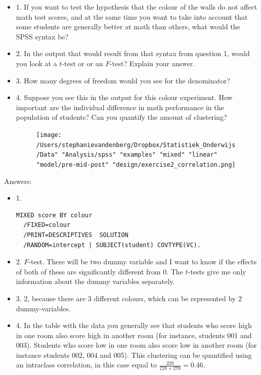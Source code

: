 \documentclass[]{report}\usepackage[]{graphicx}\usepackage[]{color}
\begin{document}
\begin{itemize}
\item 1. If you want to test the hypothesis that the colour of the walls do not affect math test scores, and at the same time you want to take into account that some students are generally better at math than others, what would the SPSS syntax be? \\
\item 2. In the output that would result from that syntax from question 1, would you look at a $t$-test or or an $F$-test? Explain your answer.
\item 3. How many degrees of freedom would you see for the denominator?\\
\item 4. Suppose you see this in the output for this colour experiment. How important are the individual difference in math performance in the population of students? Can you quantify the amount of clustering?



\begin{figure}[h]
    \begin{center}
       \texttt{[image: /Users/stephanievandenberg/Dropbox/Statistiek\_Onderwijs/Data" "Analysis/spss" "examples" "mixed" "linear" "model/pre-mid-post" "design/exercise2\_correlation.png]}
    \end{center}
\end{figure}

\end{itemize}


Answers:
\begin{itemize}
\item 1.
\\
\begin{verbatim}
MIXED score BY colour
  /FIXED=colour
  /PRINT=DESCRIPTIVES  SOLUTION
  /RANDOM=intercept | SUBJECT(student) COVTYPE(VC).
\end{verbatim}

\item 2. $F$-test. There will be two dummy variable and I want to know if the effects of both of these are significantly different from 0. The $t$-tests  give me only information about the dummy variables separately. \\
\item 3. 2, because there are 3 different colours, which can be represented by 2 dummy-variables. \\
\item 4. In the table with the data you generally see that students who score high in one room also score high in another room (for instance, students 001 and 003). Students who score low in one room also score low in another room (for instance students 002, 004 and 005). This clustering can be quantified using an intraclass correlation, in this case equal to $\frac{228}{228+270}=0.46$. 
\end{itemize}
\end{document}
